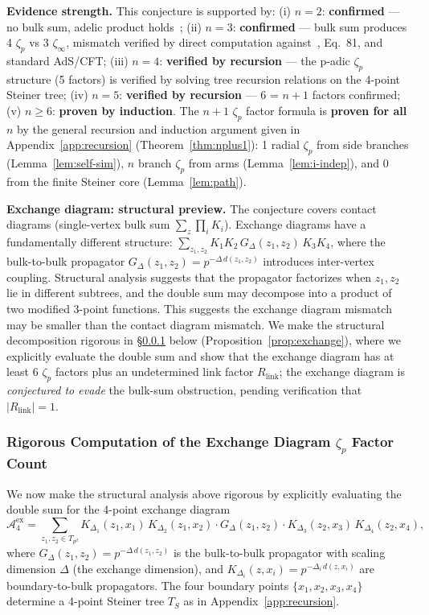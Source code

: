 \documentclass[11pt,a4paper]{article}
\begin{document}
\textbf{Evidence strength.}
This conjecture is supported by: (i) $n = 2$: \textbf{confirmed} --- no bulk sum, adelic product holds~\cite{HSYZ20}; (ii) $n = 3$: \textbf{confirmed} --- bulk sum produces 4 $\zeta_p$ vs 3 $\zeta_\infty$, mismatch verified by direct computation against~\cite{HJ24}, Eq.~81, and standard AdS/CFT; (iii) $n = 4$: \textbf{verified by recursion} --- the p-adic $\zeta_p$ structure (5 factors) is verified by solving tree recursion relations on the 4-point Steiner tree; (iv) $n = 5$: \textbf{verified by recursion} --- 6 = $n{+}1$ factors confirmed; (v) $n \geq 6$: \textbf{proven by induction}. The $n{+}1$ $\zeta_p$ factor formula is \textbf{proven for all $n$} by the general recursion and induction argument given in Appendix~\ref{app:recursion} (Theorem~\ref{thm:nplus1}): 1 radial $\zeta_p$ from side branches (Lemma~\ref{lem:self-sim}), $n$ branch $\zeta_p$ from arms (Lemma~\ref{lem:i-indep}), and 0 from the finite Steiner core (Lemma~\ref{lem:path}).

\medskip\noindent
\textbf{Exchange diagram: structural preview.}
The conjecture covers contact diagrams (single-vertex bulk sum $\sum_z \prod_i K_i$). Exchange diagrams have a fundamentally different structure: $\sum_{z_1, z_2} K_1 K_2 \, G_\Delta(z_1, z_2) \, K_3 K_4$, where the bulk-to-bulk propagator $G_\Delta(z_1, z_2) = p^{-\Delta\,d(z_1,z_2)}$ introduces inter-vertex coupling. Structural analysis suggests that the propagator factorizes when $z_1, z_2$ lie in different subtrees, and the double sum may decompose into a product of two modified 3-point functions. This suggests the exchange diagram mismatch may be smaller than the contact diagram mismatch. We make the structural decomposition rigorous in \S\ref{sec:exchange-rigorous} below (Proposition~\ref{prop:exchange}), where we explicitly evaluate the double sum and show that the exchange diagram has at least 6 $\zeta_p$ factors plus an undetermined link factor $R_{\mathrm{link}}$; the exchange diagram is \emph{conjectured to evade} the bulk-sum obstruction, pending verification that $|R_{\mathrm{link}}| = 1$.

\subsubsection{Rigorous Computation of the Exchange Diagram $\zeta_p$ Factor Count}
\label{sec:exchange-rigorous}

We now make the structural analysis above rigorous by explicitly evaluating the double sum for the 4-point exchange diagram
\begin{equation}
\label{eq:exchange-def}
\mathcal{A}^{\mathrm{ex}}_4 = \sum_{z_1, z_2 \in T_{p^d}} K_{\Delta_1}(z_1, x_1)\,K_{\Delta_2}(z_1, x_2) \cdot G_\Delta(z_1, z_2) \cdot K_{\Delta_3}(z_2, x_3)\,K_{\Delta_4}(z_2, x_4),
\end{equation}
where $G_\Delta(z_1, z_2) = p^{-\Delta\,d(z_1,z_2)}$ is the bulk-to-bulk propagator with scaling dimension $\Delta$ (the exchange dimension), and $K_{\Delta_i}(z, x_i) = p^{-\Delta_i\,d(z, x_i)}$ are boundary-to-bulk propagators. The four boundary points $\{x_1, x_2, x_3, x_4\}$ determine a 4-point Steiner tree $T_S$ as in Appendix~\ref{app:recursion}.
\end{document}
